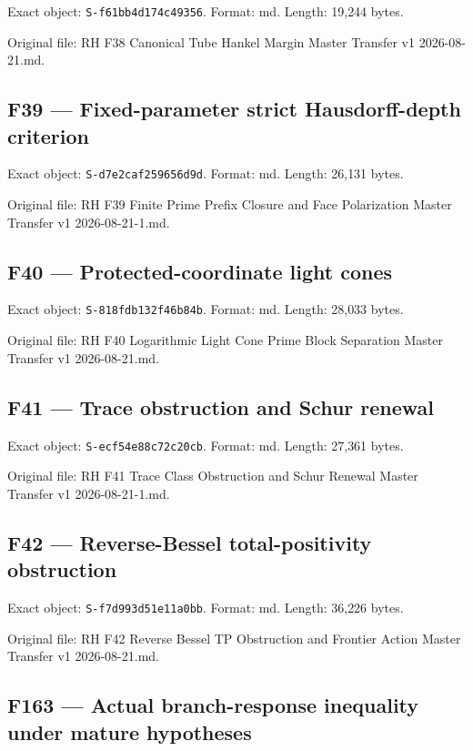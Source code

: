 \documentclass[
  10pt,
  a4paper,
  10pt,
  oneside,
  openany]{book}
\begin{document}
Exact object: \texttt{S-f61bb4d174c49356}. Format: md. Length: 19,244
bytes.

Original file: RH F38 Canonical Tube Hankel Margin Master Transfer v1
2026-08-21.md.

\subsection{F39 --- Fixed-parameter strict Hausdorff-depth
criterion}\label{source-f39}

Exact object: \texttt{S-d7e2caf259656d9d}. Format: md. Length: 26,131
bytes.

Original file: RH F39 Finite Prime Prefix Closure and Face Polarization
Master Transfer v1 2026-08-21-1.md.

\subsection{F40 --- Protected-coordinate light cones}\label{source-f40}

Exact object: \texttt{S-818fdb132f46b84b}. Format: md. Length: 28,033
bytes.

Original file: RH F40 Logarithmic Light Cone Prime Block Separation
Master Transfer v1 2026-08-21.md.

\subsection{F41 --- Trace obstruction and Schur
renewal}\label{source-f41}

Exact object: \texttt{S-ecf54e88c72c20cb}. Format: md. Length: 27,361
bytes.

Original file: RH F41 Trace Class Obstruction and Schur Renewal Master
Transfer v1 2026-08-21-1.md.

\subsection{F42 --- Reverse-Bessel total-positivity
obstruction}\label{source-f42}

Exact object: \texttt{S-f7d993d51e11a0bb}. Format: md. Length: 36,226
bytes.

Original file: RH F42 Reverse Bessel TP Obstruction and Frontier Action
Master Transfer v1 2026-08-21.md.

\subsection{F163 --- Actual branch-response inequality under mature
hypotheses}\label{source-f163}
\end{document}
